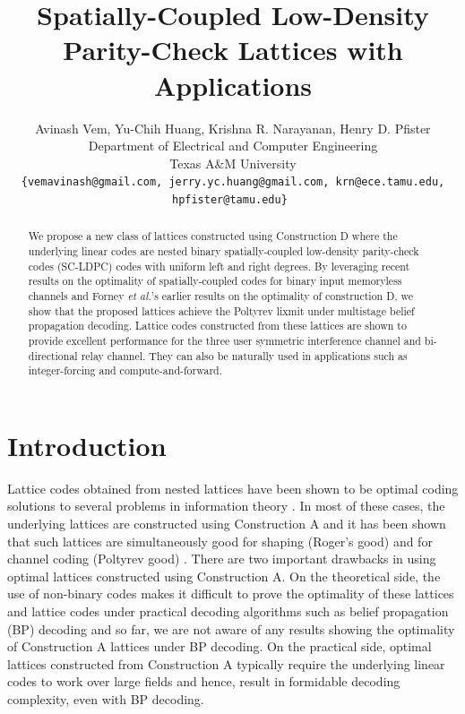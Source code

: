 \documentclass[journal]{IEEEtran}
\begin{document}
\title{Spatially-Coupled Low-Density Parity-Check Lattices with Applications}
\author{Avinash Vem, Yu-Chih Huang, Krishna R. Narayanan, Henry D. Pfister\\
Department of Electrical and Computer Engineering \\
Texas A\&M University\\
{\tt\small {\{vemavinash@gmail.com, jerry.yc.huang@gmail.com, krn@ece.tamu.edu, hpfister@tamu.edu\}} }}

\maketitle

\begin{abstract}
We propose a new class of lattices constructed using Construction D where the underlying linear codes are nested binary spatially-coupled low-density parity-check codes (SC-LDPC) codes with uniform left and right degrees. By leveraging recent results on the optimality of spatially-coupled codes for binary input memoryless channels and Forney {\em et al.}'s earlier results on the optimality of construction D, we show that the proposed lattices achieve the Poltyrev lixmit under multistage belief propagation decoding. Lattice codes constructed from these lattices are shown to provide excellent performance for the three user symmetric interference channel and bi-directional relay channel. They can also be naturally used in applications such as integer-forcing and compute-and-forward.
\end{abstract}


\section{Introduction}
Lattice codes obtained from nested lattices have been shown to be optimal coding solutions to several problems in information theory \cite{erez05}. In most of these cases, the underlying lattices are constructed using Construction A and it has been shown that such lattices are simultaneously good for shaping (Roger's good) and for channel coding (Poltyrev good) \cite{erez05}. There are two important drawbacks in using optimal lattices constructed using Construction A. On the theoretical side, the use of non-binary codes makes it difficult to prove the optimality of these lattices and lattice codes under practical decoding algorithms such as belief propagation (BP) decoding and so far, we are not aware of any results showing the optimality of Construction A lattices under BP decoding. On the practical side, optimal lattices constructed from Construction A typically require the underlying linear codes to work over large fields and hence, result in formidable decoding complexity, even with BP decoding.
\end{document}
